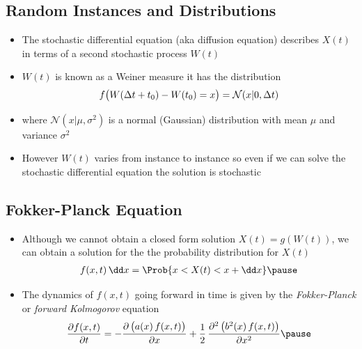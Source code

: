 \Outline %

\begin{slide}
\section{Random Instances and Distributions}

\begin{PauseHighLight}
  \begin{itemize}
  \item The stochastic differential equation (aka diffusion equation)
    describes $X(t)$ in terms of a second stochastic process
    $W(t)$\pause
  \item $W(t)$ is known as a Weiner measure it has the distribution
    \begin{align*}
      f\!\left(\strut W(\Delta t + t_0)-W(t_0)=x\right) = \mathcal{N}(x|
      0, \Delta t)
    \end{align*}
  \item where $\mathcal{N}(x|\mu,\sigma^2)$ is a normal (Gaussian)
    distribution with mean $\mu$ and variance $\sigma^2$\pause
  \item However $W(t)$ varies from instance to instance so even if we
    can solve the stochastic differential equation the solution is
    stochastic\pause 
  \end{itemize}
\end{PauseHighLight}

\end{slide}


\begin{slide}
\section{Fokker-Planck Equation}

\begin{PauseHighLight}
  \begin{itemize}
  \item Although we cannot obtain a closed form solution
    $X(t) = g(W(t))$, we can obtain a solution for the the probability
    distribution for $X(t)$
    \begin{align*}
      f(x,t)\, \dd x = \Prob{x<X(t)<x + \dd x}\pause
    \end{align*}
  \item The dynamics of $f(x,t)$ going forward in time is given by the
  \emph{Fokker-Planck} or \emph{forward Kolmogorov} equation
  \begin{align*}
    \frac{\partial f(x,t)}{\partial t} = -\frac{\partial \left(\strut
        a(x)\,f(x,t)\right)}{\partial x} + \frac{1}{2}\,
    \frac{\partial^2 \left(\strut b^2(x)\,f(x,t)\right)}{\partial x^2}\pause
  \end{align*}
  \end{itemize}
\end{PauseHighLight}

\end{slide}


